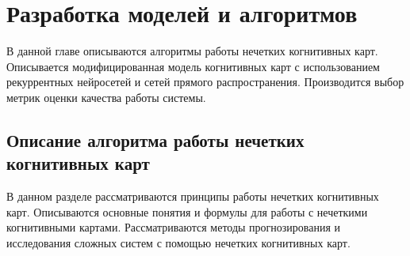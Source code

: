 \chapter{Разработка моделей и алгоритмов}



\begin{annotation}
	В данной главе описываются алгоритмы работы нечетких когнитивных карт.
	Описывается модифицированная модель когнитивных карт с использованием
	рекуррентных нейросетей и сетей прямого распространения.
	Производится выбор метрик оценки качества работы системы.
\end{annotation}

\section{Описание алгоритма работы нечетких когнитивных карт}

\begin{annotation}
	В данном разделе рассматриваются принципы работы нечетких
	когнитивных карт. Описываются основные понятия и формулы
	для работы с нечеткими когнитивными картами.
	Рассматриваются методы прогнозирования и исследования сложных систем
	с помощью нечетких когнитивных карт.
\end{annotation}







